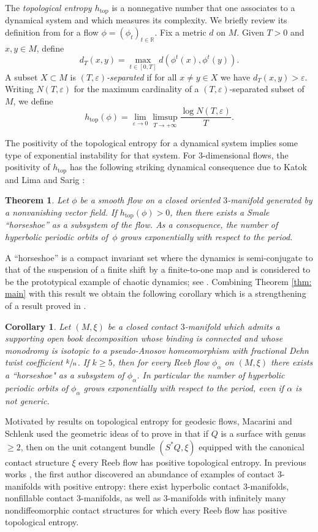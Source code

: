 \documentclass[JEP,XML,SOM,Unicode,NoFloatCountersInSection]{cedram}
\let\epsilon\varepsilon
\renewcommand{\top}{\mathrm{top}}
\theoremstyle{plain}
\newtheorem*{thm*}{Theorem}
\newtheorem{cor}[thm]{Corollary}
\theoremstyle{definition}
\numberwithin{equation}{subsection}
\newcommand{\RR}{\mathbb{R}}
\begin{document}
The {\em topological entropy $h_{\top}$} is a nonnegative number that one associates to a dynamical system and which measures its complexity. We briefly review its definition from \cite{Bo} for a flow $\phi=(\phi_t)_{t\in \RR}$. Fix a metric $d$ on $M$. Given $T>0$ and $x,y\in M$, define
$$d_T(x,y)=\max_{t\in[0,T]} d(\phi^t(x),\phi^t(y)).$$
A subset $X\subset M$ is {\em $(T,\epsilon)$-separated} if for all $x \neq y\in X$ we have $d_T(x,y)>\epsilon$. Writing $N(T,\epsilon)$ for the maximum cardinality of a $(T,\epsilon)$-separated subset of $M$, we define
$$h_{\top}(\phi)=\lim_{\epsilon\to 0}\limsup_{T\to +\infty} \frac{\log N(T,\epsilon)}{T}.$$

The positivity of the topological entropy for a dynamical system implies some type of exponential instability for that system. For $3$-dimensional flows, the positivity of $h_{\top}$ has the following striking dynamical consequence due to Katok \cite{Katok,K2} and Lima and Sarig \cite{LS,S}:

\begin{thm*}
Let $\phi$ be a smooth flow on a closed oriented $3$-manifold generated by a nonvanishing vector field. If $h_{\top}(\phi)>0$, then there exists a Smale ``horseshoe'' as a subsystem of the flow. As a consequence, the number of hyperbolic periodic orbits of~$\phi$ grows exponentially with respect to the period.
\end{thm*}

A ``horseshoe'' is a compact invariant set where the dynamics is semi-conjugate to that of the suspension of a finite shift by a finite-to-one map and is considered to be the prototypical example of chaotic dynamics; see \cite{KH}.
Combining Theorem \ref{thm: main} with this result we obtain the following corollary which is a strengthening of a result proved in \cite{CH2}.

\begin{cor}
Let $(M,\xi)$ be a closed contact $3$-manifold which admits a supporting open book decomposition whose binding is connected and whose monodromy is isotopic to a pseudo-Anosov homeomorphism with fractional Dehn twist coefficient $\sfrac{k}{n}$. If $k\geq 5$, then for every Reeb flow $\phi_\alpha$ on $(M,\xi)$ there exists a ``horseshoe" as a subsystem of $\phi_\alpha$. In particular the number of hyperbolic periodic orbits of $\phi_\alpha$ grows exponentially with respect to the period, even if $\alpha$ is not generic.
\end{cor}

Motivated by results on topological entropy for geodesic flows, Macarini and Schlenk used the geometric ideas of \cite{FS1,FS2} to prove in \cite{MS} that if $Q$ is a surface with genus $\geq 2$, then on the unit cotangent bundle $(S^{*}Q, \xi)$ equipped with the canonical contact structure $\xi$ every Reeb flow has positive topological entropy. In previous works \cite{A,Al,ReebAnosov}, the first author discovered an abundance of examples of contact $3$-manifolds with positive entropy: there exist hyperbolic contact $3$-manifolds, nonfillable contact $3$-manifolds, as well as $3$-manifolds with infinitely many nondiffeomorphic contact structures for which every Reeb flow has positive topological entropy.
\end{document}
